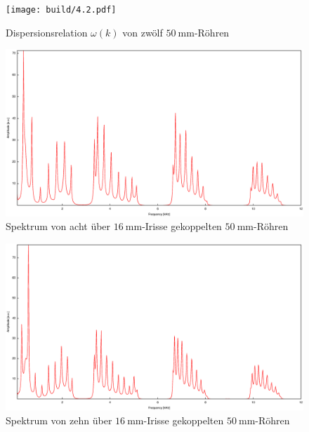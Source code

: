 \begin{figure}
\centering
\texttt{[image: build/4.2.pdf]}
\caption{Dispersionsrelation $\omega(k)$ von zwölf $\SI{50}{\milli\meter}$-Röhren}
\label{fig:w_k}
\end{figure}
\begin{figure}
\centering
\includegraphics[scale=0.35]{FP-V23data/4.3_400mm_16mm.eps}
\caption{Spektrum von acht über $\SI{16}{\milli\meter}$-Irisse gekoppelten $\SI{50}{\milli\meter}$-Röhren}
\label{fig:8_50_16}
\end{figure}
\begin{figure}
\centering
\includegraphics[scale=0.35]{FP-V23data/4.4_500mm_16mm.eps}
\caption{Spektrum von zehn über $\SI{16}{\milli\meter}$-Irisse gekoppelten $\SI{50}{\milli\meter}$-Röhren}
\label{fig:10_50_16}
\end{figure}
